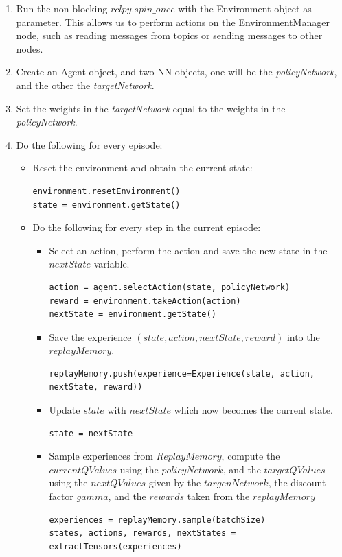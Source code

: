 \documentclass[12pt,oneside]{article}
\begin{document}
\begin{enumerate}
\item Run the non-blocking $rclpy.spin\_once$ with the Environment object as parameter. This allows us to perform actions on the EnvironmentManager node, such as reading messages from topics or sending messages to other nodes.
\item Create an Agent object, and two NN objects, one will be the \textit{policyNetwork}, and the other the \textit{targetNetwork}.
\item Set the weights in the \textit{targetNetwork} equal to the weights in the \textit{policyNetwork}.
\item Do the following for every episode:
	\begin{itemize}
		\item Reset the environment and obtain the current state:
\begin{verbatim}
environment.resetEnvironment()
state = environment.getState()
\end{verbatim}
		\item Do the following for every step in the current episode:
		\begin{itemize}
			\item Select an action, perform the action and save the new state in the $nextState$ variable.
\begin{verbatim}
action = agent.selectAction(state, policyNetwork)
reward = environment.takeAction(action)
nextState = environment.getState()
\end{verbatim}
			\item Save the experience $(state, action, nextState, reward)$ into the $replayMemory$.
\begin{verbatim}
replayMemory.push(experience=Experience(state, action, nextState, reward))
\end{verbatim}
			\item Update $state$ with $nextState$ which now becomes the current state.
\begin{verbatim}
state = nextState
\end{verbatim}
			\item Sample experiences from $ReplayMemory$, compute the $currentQValues$ using the $policyNetwork$, and the $targetQValues$ using the $nextQValues$ given by the $targenNetwork$, the discount factor $gamma$, and the $rewards$ taken from the $replayMemory$
\begin{verbatim}
experiences = replayMemory.sample(batchSize)
states, actions, rewards, nextStates = extractTensors(experiences)


\end{verbatim}
\end{itemize}
\end{itemize}
\end{enumerate}
\end{document}
